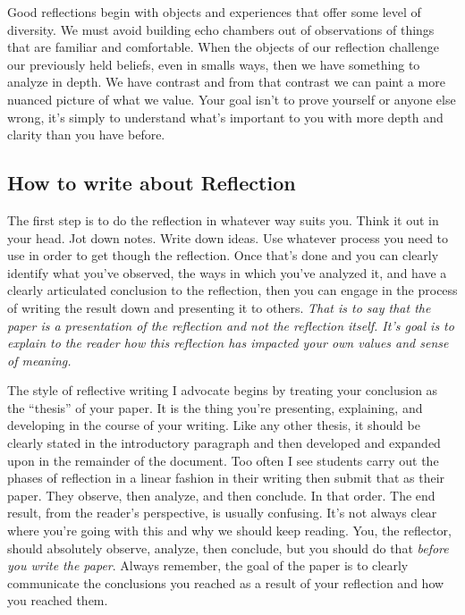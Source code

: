 \documentclass[nobib]{tufte-handout}
\begin{document}
Good reflections begin with objects and experiences that offer some level of diversity. We must avoid building echo chambers out of observations of things that are familiar and comfortable.  When the objects of our reflection challenge our previously held beliefs, even in smalls ways, then we have something to analyze in depth. We have contrast and from that contrast we can paint a more nuanced picture of what we value. Your goal isn't to prove yourself or anyone else wrong, it's simply to understand what's important to you with more depth and clarity than you have before.


\subsection*{How to write about Reflection}

The first step is to do the reflection in whatever way suits you. Think it out in your head. Jot down notes. Write down ideas. Use whatever process you need to use in order to get though the reflection. Once that's done and you can clearly identify what you've observed, the ways in which you've analyzed it, and have a clearly articulated conclusion to the reflection, then you can engage in the process of writing the result down and presenting it to others. \textit{That is to say that the paper is a presentation of the reflection and not the reflection itself. It's goal is to explain to the reader how this reflection has impacted your own values and sense of meaning.}

The style of reflective writing I advocate begins by treating your conclusion as the ``thesis'' of your paper. It is the thing you're presenting, explaining, and developing in the course of your writing. Like any other thesis, it should be clearly stated in the introductory paragraph and then developed and expanded upon in the remainder of the document. Too often I see students carry out the phases of reflection in a linear fashion in their writing then submit that as their paper.  They observe, then analyze, and then conclude.  In that order. The end result, from the reader's perspective, is usually confusing. It's not always clear where you're going with this and why we should keep reading. You, the reflector, should absolutely observe, analyze, then conclude, but you should do that \textit{before you write the paper}.  Always remember, the goal of the paper is to clearly communicate the conclusions you reached as a result of your reflection and how you reached them.
\end{document}
